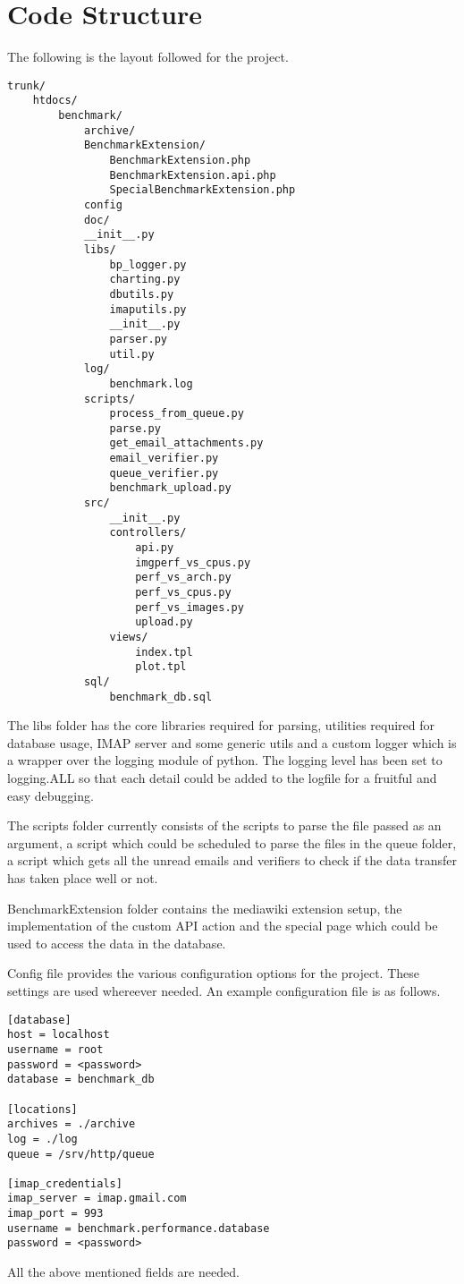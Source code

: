 \documentclass[a4paper,12pt, titlepage]{article}
\begin{document}
\section{Code Structure}
The following is the layout followed for the project.
\begin{verbatim}
trunk/
    htdocs/
        benchmark/
            archive/  
            BenchmarkExtension/
                BenchmarkExtension.php
                BenchmarkExtension.api.php
                SpecialBenchmarkExtension.php
            config  
            doc/
            __init__.py
            libs/
                bp_logger.py
                charting.py
                dbutils.py
                imaputils.py  
                __init__.py  
                parser.py  
                util.py
            log/
                benchmark.log
            scripts/
                process_from_queue.py  
                parse.py  
                get_email_attachments.py  
                email_verifier.py
                queue_verifier.py
                benchmark_upload.py
            src/
                __init__.py
                controllers/
                    api.py
                    imgperf_vs_cpus.py
                    perf_vs_arch.py
                    perf_vs_cpus.py
                    perf_vs_images.py
                    upload.py
                views/
                    index.tpl
                    plot.tpl
            sql/
                benchmark_db.sql
\end{verbatim}

The libs folder has the core libraries required for parsing, utilities required for database usage, IMAP server and some generic utils and a custom logger which is a wrapper over the logging module of python. The logging level has been set to logging.ALL so that each detail could be added to the logfile for a fruitful and easy debugging.

The scripts folder currently consists of the scripts to parse the file passed as an argument, a script which could be scheduled to parse the files in the queue folder, a script which gets all the unread emails and verifiers to check if the data transfer has taken place well or not.

BenchmarkExtension folder contains the mediawiki extension setup, the implementation of the custom API action and the special page which could be used to access the data in the database.

Config file provides the various configuration options for the project. These settings are used whereever needed. An example configuration file is as follows.
\begin{verbatim}
[database]
host = localhost
username = root
password = <password>
database = benchmark_db

[locations]
archives = ./archive
log = ./log
queue = /srv/http/queue

[imap_credentials]
imap_server = imap.gmail.com
imap_port = 993
username = benchmark.performance.database
password = <password>
\end{verbatim}
All the above mentioned fields are needed.
\end{document}
